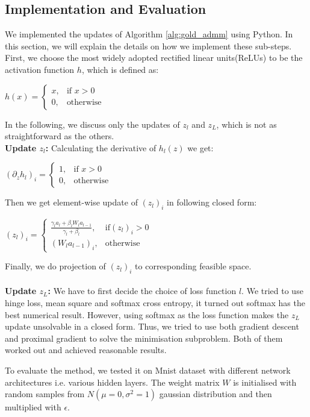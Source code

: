 \documentclass[letterpaper, 10 pt, conference]{ieeeconf}  %
\begin{document}
\subsection{Implementation and Evaluation}
We implemented the updates of  Algorithm \ref{alg:gold_admm} using Python. In this section, we will explain the details on how we implement these sub-steps. First, we choose the most widely adopted rectified linear units(ReLUs) to be the activation function $h$, which is defined as:
\begin{center}
$h(x) = \begin{cases} x, & \mbox{if } x> 0 \\0, & \mbox{otherwise }\end{cases} $
\end{center}

In the following, we discuss only the updates of $z_l$ and $z_L$, which is not as straightforward as the others.\\
\textbf{Update $z_l$:  }  Calculating the derivative of $h_l(z)$  we get:
\begin{center}
$(\partial_z h_l)_i = \begin{cases} 1, & \mbox{if } x> 0 \\0, & \mbox{otherwise }\end{cases} $
\end{center}
Then we get element-wise update of $(z_l)_i$ in following closed form:
\begin{center}
$(z_l)_i = \begin{cases} \frac{\gamma_la_l + \beta_lW_la_{l-1}}{\gamma_l + \beta_l}, & \mbox{if} (z_l)_i> 0 \\(W_la_{l-1})_i, & \mbox{otherwise}\end{cases} $
\end{center}
Finally, we do projection of $(z_l)_i$ to corresponding feasible space. \\\\
\textbf{Update $z_L$:  }  We have to first decide the choice of loss function $l$. We tried to use hinge loss, mean square and softmax cross entropy, it turned out softmax has the best numerical result. However, using softmax as the loss function makes the $z_L$ update unsolvable in a closed form. Thus, we tried to use both gradient descent and proximal gradient to solve the minimisation subproblem. Both of them worked out and achieved reasonable results. 

To evaluate the method, we tested it on Mnist dataset with different network architectures i.e. various hidden layers. The weight matrix $W$ is initialised with random samples from $N(\mu=0, \sigma^2=1)$ gaussian distribution and then multiplied with $\epsilon$. 
\end{document}
